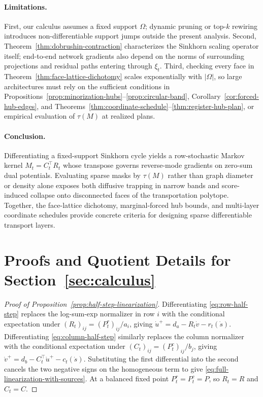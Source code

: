 \documentclass[10pt]{article}
\begin{document}
\paragraph{Limitations.}
First, our calculus assumes a fixed support $\Omega$; dynamic pruning or top-$k$ rewiring introduces non-differentiable support jumps outside the present analysis. Second, Theorem~\ref{thm:dobrushin-contraction} characterizes the Sinkhorn scaling operator itself; end-to-end network gradients also depend on the norms of surrounding projections and residual paths entering through $\xi_t$. Third, checking every face in Theorem~\ref{thm:face-lattice-dichotomy} scales exponentially with $|\Omega|$, so large architectures must rely on the sufficient conditions in Propositions~\ref{prop:minorization-hubs}--\ref{prop:circular-band}, Corollary~\ref{cor:forced-hub-edges}, and Theorems~\ref{thm:coordinate-schedule}--\ref{thm:register-hub-plan}, or empirical evaluation of $\tau(M)$ at realized plans.

\paragraph{Conclusion.}
Differentiating a fixed-support Sinkhorn cycle yields a row-stochastic Markov kernel $M_t = C_t^\top R_t$ whose transpose governs reverse-mode gradients on zero-sum dual potentials. Evaluating sparse masks by $\tau(M)$ rather than graph diameter or density alone exposes both diffusive trapping in narrow bands and score-induced collapse onto disconnected faces of the transportation polytope. Together, the face-lattice dichotomy, marginal-forced hub bounds, and multi-layer coordinate schedules provide concrete criteria for designing sparse differentiable transport layers.

\appendix

\section{Proofs and Quotient Details for Section~\ref{sec:calculus}}
\label{app:calculus-proofs}

\begin{proof}[Proof of Proposition~\ref{prop:half-step-linearization}]
Differentiating \eqref{eq:row-half-step} replaces the log-sum-exp normalizer in row $i$ with the conditional expectation under $(R_t)_{ij} = (P_t^r)_{ij}/a_i$, giving $\dot u^+ = d_a - R_t \dot v - r_t(\dot s)$. Differentiating \eqref{eq:column-half-step} similarly replaces the column normalizer with the conditional expectation under $(C_t)_{ij} = (P_t^c)_{ij}/b_j$, giving $\dot v^+ = d_b - C_t^\top \dot u^+ - c_t(\dot s)$. Substituting the first differential into the second cancels the two negative signs on the homogeneous term to give \eqref{eq:full-linearization-with-sources}. At a balanced fixed point $P_t^r = P_t^c = P$, so $R_t = R$ and $C_t = C$.
\end{proof}
\end{document}
